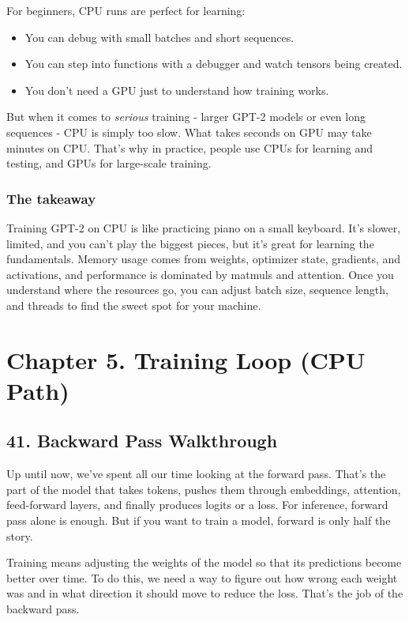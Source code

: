 \documentclass[
  letterpaper,
  DIV=11,
  numbers=noendperiod]{scrreprt}
\providecommand{\tightlist}{%
  \setlength{\itemsep}{0pt}\setlength{\parskip}{0pt}}
\begin{document}
For beginners, CPU runs are perfect for learning:

\begin{itemize}
\tightlist
\item
  You can debug with small batches and short sequences.
\item
  You can step into functions with a debugger and watch tensors being
  created.
\item
  You don't need a GPU just to understand how training works.
\end{itemize}

But when it comes to \emph{serious} training - larger GPT-2 models or
even long sequences - CPU is simply too slow. What takes seconds on GPU
may take minutes on CPU. That's why in practice, people use CPUs for
learning and testing, and GPUs for large-scale training.

\subsubsection{The takeaway}\label{the-takeaway-29}

Training GPT-2 on CPU is like practicing piano on a small keyboard. It's
slower, limited, and you can't play the biggest pieces, but it's great
for learning the fundamentals. Memory usage comes from weights,
optimizer state, gradients, and activations, and performance is
dominated by matmuls and attention. Once you understand where the
resources go, you can adjust batch size, sequence length, and threads to
find the sweet spot for your machine.

\section{Chapter 5. Training Loop (CPU
Path)}\label{chapter-5.-training-loop-cpu-path}

\subsection{41. Backward Pass
Walkthrough}\label{backward-pass-walkthrough}

Up until now, we've spent all our time looking at the forward pass.
That's the part of the model that takes tokens, pushes them through
embeddings, attention, feed-forward layers, and finally produces logits
or a loss. For inference, forward pass alone is enough. But if you want
to train a model, forward is only half the story.

Training means adjusting the weights of the model so that its
predictions become better over time. To do this, we need a way to figure
out how wrong each weight was and in what direction it should move to
reduce the loss. That's the job of the backward pass.
\end{document}
